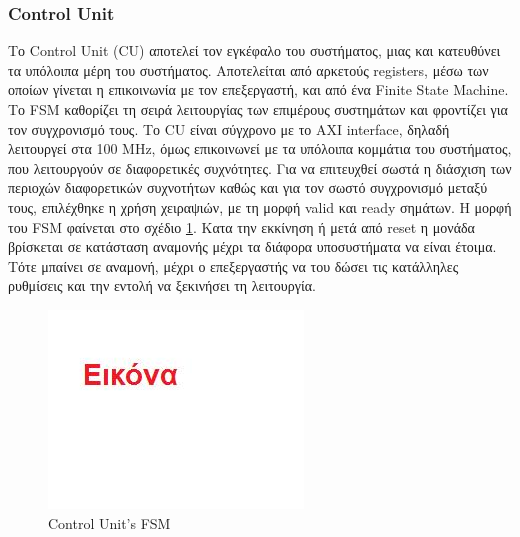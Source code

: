 \documentclass[12pt,a4paper]{book}
\begin{document}
\subsubsection{Control Unit}
Το Control Unit (CU) αποτελεί τον εγκέφαλο του συστήματος, μιας και κατευθύνει τα υπόλοιπα μέρη του συστήματος. Αποτελείται από αρκετούς registers, μέσω των οποίων γίνεται η επικοινωνία με τον επεξεργαστή, και από ένα Finite State Machine. Το FSM καθορίζει τη σειρά λειτουργίας των επιμέρους συστημάτων και φροντίζει για τον συγχρονισμό τους. 
Το CU είναι σύγχρονο με το AXI interface, δηλαδή λειτουργεί στα 100 MHz, όμως επικοινωνεί με τα υπόλοιπα κομμάτια του συστήματος, που λειτουργούν σε διαφορετικές συχνότητες. Για να επιτευχθεί σωστά η διάσχιση των περιοχών διαφορετικών συχνοτήτων καθώς και για τον σωστό συγχρονισμό μεταξύ τους, επιλέχθηκε η χρήση χειραψιών, με τη μορφή valid και ready σημάτων. 
Η μορφή του FSM φαίνεται στο σχέδιο \ref{CUFSM}. Κατα την εκκίνηση ή μετά από reset η μονάδα βρίσκεται σε κατάσταση αναμονής μέχρι τα διάφορα υποσυστήματα να είναι έτοιμα. Τότε μπαίνει σε αναμονή, μέχρι ο επεξεργαστής να του δώσει τις κατάλληλες ρυθμίσεις και την εντολή να ξεκινήσει τη λειτουργία.
\begin{figure}
	\centering
	\includegraphics[width=\textwidth]{myimage}
	\caption{Control Unit's FSM}
	\label{CUFSM}
\end{figure}
\end{document}
